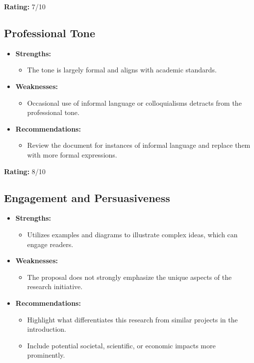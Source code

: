 \documentclass{article}
\begin{document}
\textbf{Rating:} 7/10

\subsection{Professional Tone}
\begin{itemize}
    \item \textbf{Strengths:}
    \begin{itemize}
        \item The tone is largely formal and aligns with academic standards.
    \end{itemize}

    \item \textbf{Weaknesses:}
    \begin{itemize}
        \item Occasional use of informal language or colloquialisms detracts from the professional tone.
    \end{itemize}

    \item \textbf{Recommendations:}
    \begin{itemize}
        \item Review the document for instances of informal language and replace them with more formal expressions.
    \end{itemize}
\end{itemize}

\textbf{Rating:} 8/10

\subsection{Engagement and Persuasiveness}
\begin{itemize}
    \item \textbf{Strengths:}
    \begin{itemize}
        \item Utilizes examples and diagrams to illustrate complex ideas, which can engage readers.
    \end{itemize}

    \item \textbf{Weaknesses:}
    \begin{itemize}
        \item The proposal does not strongly emphasize the unique aspects of the research initiative.
    \end{itemize}

    \item \textbf{Recommendations:}
    \begin{itemize}
        \item Highlight what differentiates this research from similar projects in the introduction.
        \item Include potential societal, scientific, or economic impacts more prominently.
    \end{itemize}
\end{itemize}
\end{document}
